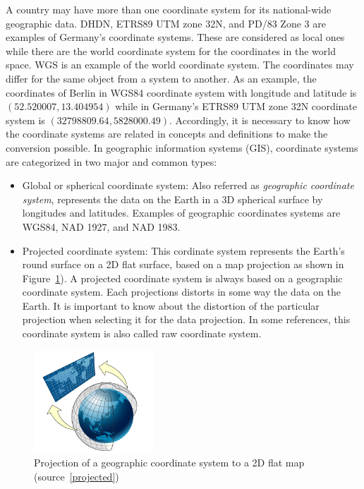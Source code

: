 \documentclass[a4paper,12pt]{article}
\begin{document}
A country may have more than one coordinate system for its national-wide geographic data. DHDN, ETRS89 UTM zone 32N, and PD/83 Zone 3 are examples of Germany's coordinate systems. These are considered as local ones while there are the world coordinate system for the coordinates in the world space. WGS is an example of the world coordinate system. The coordinates may differ for the same object from a system to another. As an example, the coordinates of Berlin in WGS84 coordinate system with longitude and latitude is $(52.520007, 13.404954)$ while in Germany's ETRS89 UTM zone 32N coordinate system is $(32798809.64, 5828000.49)$. Accordingly, it is necessary to know how the coordinate systems are related in concepts and definitions to make the conversion possible. 
In geographic information systems (GIS), coordinate systems are categorized in two major and common types:
\begin{itemize}
\item Global or spherical coordinate system: Also referred as \textit{geographic coordinate system}, represents the data on the Earth in a 3D spherical surface by longitudes and latitudes. Examples of geographic coordinates systems are WGS84, NAD 1927, and NAD 1983. 

\item Projected coordinate system: This cordinate system represents the Earth's round surface on a 2D flat surface, based on a map projection as shown in Figure~\ref{figproject}). A projected coordinate system is always based on a geographic coordinate system. Each projections distorts in some way the data on the Earth. It is important to know about the distortion of the particular projection when selecting it for the data projection. 
In some references, this coordinate system is also called raw coordinate system.
\end{itemize}

\begin{figure}
\centering
\includegraphics[width=0.4\textwidth]{sphere_to_cylinder}
\caption{Projection of a geographic coordinate system to a 2D flat map (source~\ref{projected})}
\label{figproject}
\end{figure}
\end{document}

